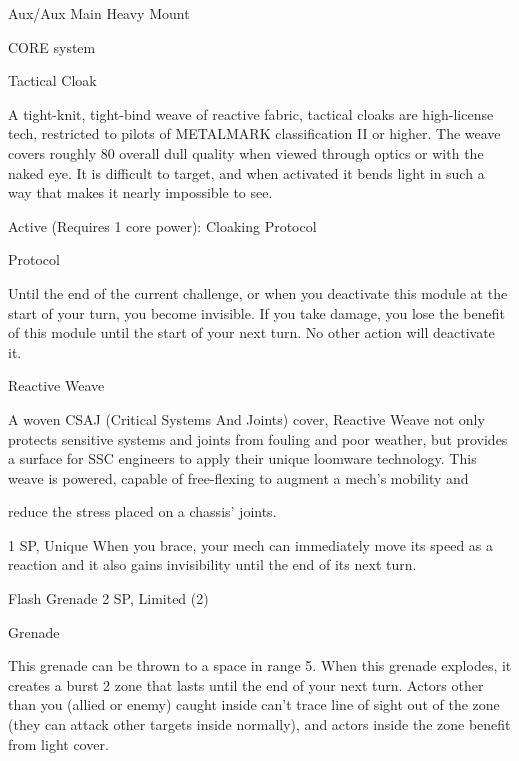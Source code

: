  Aux/Aux                             Main                                   Heavy Mount 

                                                 CORE system 

                                                 Tactical Cloak  

 A tight-knit, tight-bind weave of reactive fabric, tactical cloaks are high-license tech, restricted to pilots  
  of METALMARK classification II or higher. The weave covers roughly 80%
  overall dull quality when viewed through optics or with the naked eye. It is difficult to target, and when  
 activated it bends light in such a way that makes it nearly impossible to see.   

 Active (Requires 1 core power):  
  Cloaking Protocol
 
  Protocol
 
  Until the end of the current challenge, or when you deactivate this module at the start of your turn, you  
  become invisible. If you take damage, you lose the benefit of this module until the start of your next  
  turn. No other action will deactivate it. 

Reactive Weave  

A woven CSAJ (Critical Systems And Joints) cover, Reactive Weave not only protects sensitive systems and  
joints from fouling and poor weather, but provides a surface for SSC engineers to apply their unique  
loomware technology. This weave is powered, capable of free-flexing to augment a mech’s mobility and  

reduce the stress placed on a chassis’ joints.   

                                                                                                                


1 SP, Unique  
When you brace, your mech can immediately move its speed as a reaction and it also gains  
invisibility until the end of its next turn.
 

Flash Grenade  
2 SP, Limited (2)
 
Grenade
 

This grenade can be thrown to a space in range 5. When this grenade explodes, it creates a  
burst 2 zone that lasts until the end of your next turn. Actors other than you (allied or enemy)  
caught inside can’t trace line of sight out of the zone (they can attack other targets inside  
normally), and actors inside the zone benefit from light cover.
 

